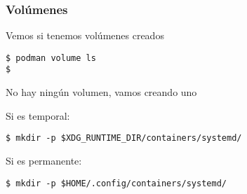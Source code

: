 \begin{frame}[fragile]
  \frametitle{Volúmenes}

  Vemos si tenemos volúmenes creados

  \begin{lstlisting}
$ podman volume ls
$
  \end{lstlisting}

  No hay ningún volumen, vamos creando uno

  \pausa
  \begin{exampleblock}{Si es temporal:}
    \begin{lstlisting}
$ mkdir -p $XDG_RUNTIME_DIR/containers/systemd/
    \end{lstlisting}
  \end{exampleblock}
  \pausa
  \begin{block}{Si es permanente:}
    \begin{lstlisting}
$ mkdir -p $HOME/.config/containers/systemd/
    \end{lstlisting}
  \end{block}
\end{frame}

